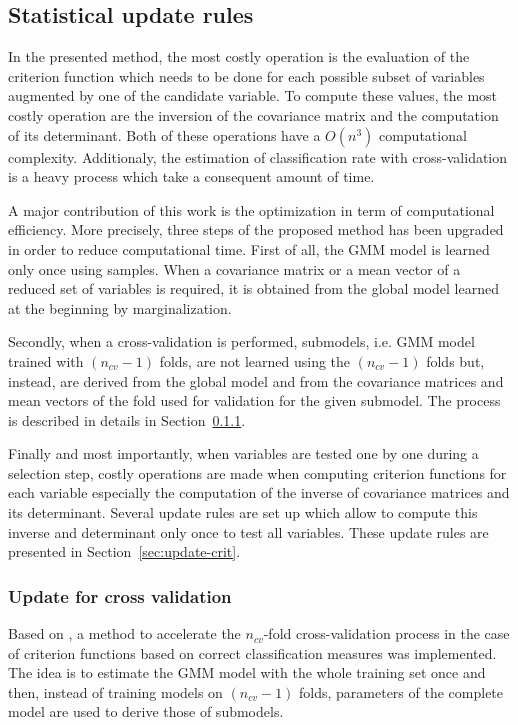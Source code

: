 \documentclass[journal,peerreview,onecolumn]{IEEEtran}
\begin{document}
    \subsection{Statistical update rules}
    In the presented method, the most costly operation is the evaluation of the criterion function which needs to be done for each possible subset of variables augmented by one of the candidate variable. To compute these values, the most costly operation are the inversion of the covariance matrix and the computation of its determinant. Both of these operations have a $O(n^3)$ computational complexity. Additionaly, the estimation of classification rate with cross-validation is a heavy process which take a consequent amount of time.

    A major contribution of this work is the optimization in term of computational efficiency. More precisely, three steps of the proposed method has been upgraded in order to reduce computational time. First of all, the GMM model is learned only once using samples. When a covariance matrix or a mean vector of a reduced set of variables is required, it is obtained from the global model learned at the beginning by marginalization.

    Secondly, when a cross-validation is performed, submodels, i.e. GMM model trained with $(n_{cv}-1)$ folds, are not learned using the $(n_{cv}-1)$ folds but, instead, are derived from the global model and from the covariance matrices and mean vectors of the fold used for validation for the given submodel. The process is described in details in Section~\ref{sec:update-cv}.

    Finally and most importantly, when variables are tested one by one during a selection step, costly operations are made when computing criterion functions for each variable especially the computation of the inverse of covariance matrices and its determinant. Several update rules are set up which allow to compute this inverse and determinant only once to test all variables. These update rules are presented in Section~\ref{sec:update-crit}.

        \subsubsection{Update for cross validation}
        \label{sec:update-cv}

        Based on \cite{fauvel2015fast}, a method to accelerate the $n_{cv}$-fold cross-validation process in the case of criterion functions based on correct classification measures was implemented. The idea is to estimate the GMM model with the whole training set once and then, instead of training models on $(n_{cv}-1)$ folds, parameters of the complete model are used to derive those of submodels.
\end{document}
